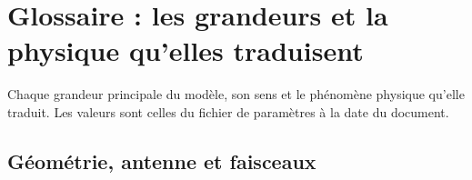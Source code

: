 \documentclass[11pt,a4paper]{article}
\begin{document}
\section{Glossaire : les grandeurs et la physique qu'elles traduisent}\label{sec:glossary}
Chaque grandeur principale du modèle, son sens et le phénomène physique qu'elle traduit. Les valeurs sont celles du
fichier de paramètres à la date du document.

\subsection{Géométrie, antenne et faisceaux}
\end{document}
